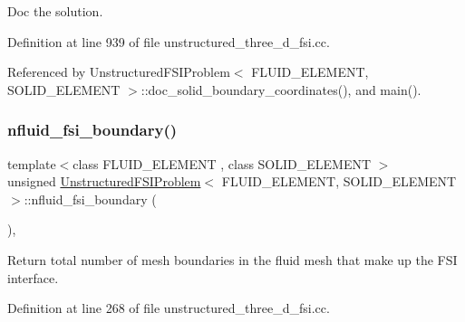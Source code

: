 Doc the solution. 



Definition at line 939 of file unstructured\+\_\+three\+\_\+d\+\_\+fsi.\+cc.



Referenced by Unstructured\+F\+S\+I\+Problem$<$ F\+L\+U\+I\+D\+\_\+\+E\+L\+E\+M\+E\+N\+T, S\+O\+L\+I\+D\+\_\+\+E\+L\+E\+M\+E\+N\+T $>$\+::doc\+\_\+solid\+\_\+boundary\+\_\+coordinates(), and main().

\mbox{\label{classUnstructuredFSIProblem_a7ef3b155002c3a71a7cb43d8c86a7a6d}} 
\subsubsection{\texorpdfstring{nfluid\+\_\+fsi\+\_\+boundary()}{nfluid\_fsi\_boundary()}}
{\footnotesize\ttfamily template$<$class F\+L\+U\+I\+D\+\_\+\+E\+L\+E\+M\+E\+NT , class S\+O\+L\+I\+D\+\_\+\+E\+L\+E\+M\+E\+NT $>$ \\
unsigned \hyperlink{classUnstructuredFSIProblem}{Unstructured\+F\+S\+I\+Problem}$<$ F\+L\+U\+I\+D\+\_\+\+E\+L\+E\+M\+E\+NT, S\+O\+L\+I\+D\+\_\+\+E\+L\+E\+M\+E\+NT $>$\+::nfluid\+\_\+fsi\+\_\+boundary (\begin{DoxyParamCaption}{ }\end{DoxyParamCaption})\hspace{0.3cm}{\ttfamily [inline]}, {\ttfamily [private]}}



Return total number of mesh boundaries in the fluid mesh that make up the F\+SI interface. 



Definition at line 268 of file unstructured\+\_\+three\+\_\+d\+\_\+fsi.\+cc.

\mbox{\label{classUnstructuredFSIProblem_a74a81b12db3e54dffcb68ebd0447610c}} 
